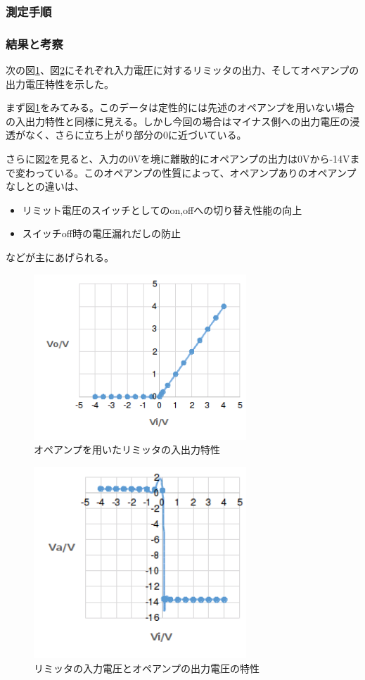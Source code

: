 \documentclass[11pt,a4j]{jsarticle}
\begin{document}
   \subsubsection{測定手順}
    
    
   \subsubsection{結果と考察}
    次の図\ref{fig:1_1_amp_PS_ViVo}、図\ref{fig:1_1_amp_PS_ViVa}にそれぞれ入力電圧に対するリミッタの出力、そしてオペアンプの出力電圧特性を示した。
    
    まず図\ref{fig:1_1_amp_PS_ViVo}をみてみる。このデータは定性的には先述のオペアンプを用いない場合の入出力特性と同様に見える。しかし今回の場合はマイナス側への出力電圧の浸透がなく、さらに立ち上がり部分の0に近づいている。
    
    さらに図\ref{fig:1_1_amp_PS_ViVa}を見ると、入力の0Vを境に離散的にオペアンプの出力は0Vから-14Vまで変わっている。このオペアンプの性質によって、オペアンプありのオペアンプなしとの違いは、
    \begin{itemize}
    \item リミット電圧のスイッチとしてのon,offへの切り替え性能の向上
    \item スイッチoff時の電圧漏れだしの防止
    \end{itemize}
    などが主にあげられる。
    
    \begin{figure}[htbp]
  \centering
  \includegraphics[width=8cm,clip]{1_1_amp_PS_ViVo.png}
  \caption{オペアンプを用いたリミッタの入出力特性}
  \label{fig:1_1_amp_PS_ViVo}
 \end{figure}%
   
   \begin{figure}[htbp]
  \centering
  \includegraphics[width=8cm,clip]{1_1_amp_PS_ViVa.png}
  \caption{リミッタの入力電圧とオペアンプの出力電圧の特性}
  \label{fig:1_1_amp_PS_ViVa}
 \end{figure}%
    
\end{document}
